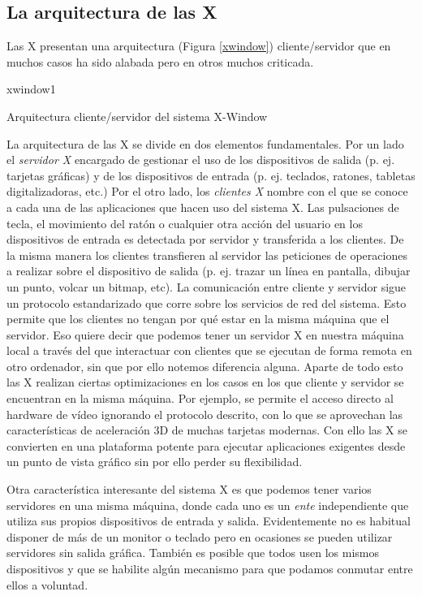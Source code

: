 \subsection{La arquitectura de las X} 

Las  {\sf   X}  presentan  una  arquitectura   (Figura  \ref{xwindow})
cliente/servidor que  en muchos  casos ha sido  alabada pero  en otros
muchos criticada.

\begin{figura}{xwindow}{1}
\caption{Arquitectura cliente/servidor del sistema X-Window}
\label{xwindow}
\end{figura}

La arquitectura de las {\sf X} se divide en dos elementos
fundamentales.  Por un lado el {\em servidor X}
encargado de gestionar el uso de los dispositivos de salida (p. ej.
tarjetas gráficas) y de los dispositivos de entrada (p. ej. teclados,
ratones, tabletas digitalizadoras, etc.) Por el otro lado, los {\em
clientes X} nombre con el que se conoce a cada una de
las aplicaciones que hacen uso del sistema {\sf X}. Las pulsaciones de
tecla, el movimiento del ratón o cualquier otra acción del usuario en
los dispositivos de entrada es detectada por servidor y transferida a
los clientes. De la misma manera los clientes transfieren al servidor
las peticiones de operaciones a realizar sobre el dispositivo de
salida (p. ej.  trazar un línea en pantalla, dibujar un punto, volcar
un bitmap, etc). La comunicación entre cliente y servidor sigue un
protocolo estandarizado que corre sobre los servicios de red del
sistema. Esto permite que los clientes no tengan por qué estar en la
misma máquina que el servidor. Eso quiere decir que podemos tener un
servidor {\sf X} en nuestra máquina local a través del que interactuar
con clientes que se ejecutan de forma remota en otro ordenador, sin
que por ello notemos diferencia alguna. Aparte de todo esto las {\sf
X} realizan ciertas optimizaciones en los casos en los que cliente y
servidor se encuentran en la misma máquina. Por ejemplo, se permite el
acceso directo al hardware de vídeo ignorando el protocolo descrito,
con lo que se aprovechan las características de aceleración 3D de
muchas tarjetas modernas. Con ello las {\sf X} se convierten en una
plataforma potente para ejecutar aplicaciones exigentes desde un punto
de vista gráfico sin por ello perder su flexibilidad.

Otra característica  interesante del  sistema {\sf  X} es  que podemos
tener varios  servidores en una  misma máquina,  donde cada uno  es un
{\em  ente}  independiente que  utiliza  sus  propios dispositivos  de
entrada y salida.  Evidentemente no es habitual disponer de  más de un
monitor o  teclado pero en  ocasiones se pueden  utilizar servidores
sin  salida gráfica.  También es  posible  que todos  usen los  mismos
dispositivos  y  que se  habilite  algún  mecanismo para  que  podamos
conmutar entre ellos a voluntad.

